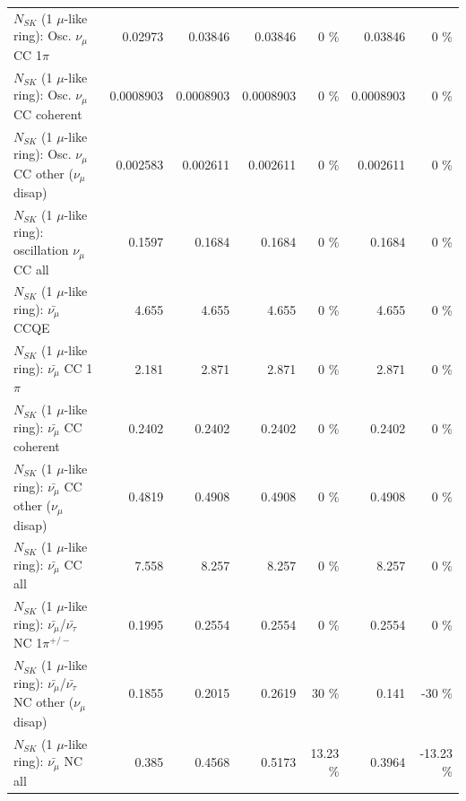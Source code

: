 \begin{table}
\begin{tabular}{| l | r | r | r  r | r  r |}
                          $N_{SK}$ (1 $\mu$-like ring): Osc. $\nu_\mu$ CC 1$\pi$ &         0.02973 &         0.03846 &         0.03846 &        0 \%  &         0.03846 &        0 \%  \\ 
                        $N_{SK}$ (1 $\mu$-like ring): Osc. $\nu_\mu$ CC coherent &       0.0008903 &       0.0008903 &       0.0008903 &        0 \%  &       0.0008903 &        0 \%  \\ 
         $N_{SK}$ (1 $\mu$-like ring): Osc. $\nu_\mu$ CC other ($\nu_\mu$ disap) &        0.002583 &        0.002611 &        0.002611 &        0 \%  &        0.002611 &        0 \%  \\ 
                      $N_{SK}$ (1 $\mu$-like ring): oscillation $\nu_\mu$ CC all &          0.1597 &          0.1684 &          0.1684 &        0 \%  &          0.1684 &        0 \%  \\ 
\hline
\hline
                              $N_{SK}$ (1 $\mu$-like ring): $\bar{\nu_\mu}$ CCQE &           4.655 &           4.655 &           4.655 &        0 \%  &           4.655 &        0 \%  \\ 
                         $N_{SK}$ (1 $\mu$-like ring): $\bar{\nu_\mu}$ CC 1$\pi$ &           2.181 &           2.871 &           2.871 &        0 \%  &           2.871 &        0 \%  \\ 
                       $N_{SK}$ (1 $\mu$-like ring): $\bar{\nu_\mu}$ CC coherent &          0.2402 &          0.2402 &          0.2402 &        0 \%  &          0.2402 &        0 \%  \\ 
        $N_{SK}$ (1 $\mu$-like ring): $\bar{\nu_\mu}$ CC other ($\nu_\mu$ disap) &          0.4819 &          0.4908 &          0.4908 &        0 \%  &          0.4908 &        0 \%  \\ 
                          $N_{SK}$ (1 $\mu$-like ring): $\bar{\nu_{\mu}}$ CC all &           7.558 &           8.257 &           8.257 &        0 \%  &           8.257 &        0 \%  \\ 
\hline
  $N_{SK}$ (1 $\mu$-like ring): $\bar{\nu_\mu}$/$\bar{\nu_\tau}$ NC 1$\pi^{+/-}$ &          0.1995 &          0.2554 &          0.2554 &        0 \%  &          0.2554 &        0 \%  \\ 
$N_{SK}$ (1 $\mu$-like ring): $\bar{\nu_\mu}$/$\bar{\nu_\tau}$ NC other ($\nu_\mu$ disap) &          0.1855 &          0.2015 &          0.2619 &       30 \%  &           0.141 &      -30 \%  \\ 
                          $N_{SK}$ (1 $\mu$-like ring): $\bar{\nu_{\mu}}$ NC all &           0.385 &          0.4568 &          0.5173 &    13.23 \%  &          0.3964 &   -13.23 \%  \\ 

\end{tabular}
\end{table}
